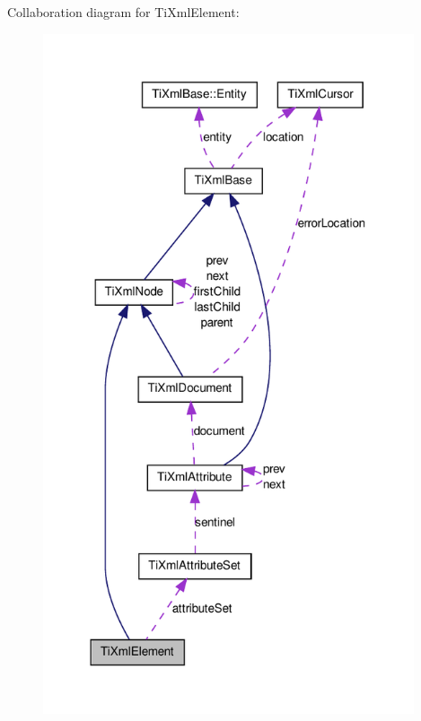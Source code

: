 Collaboration diagram for TiXmlElement:
\nopagebreak
\begin{figure}[H]
\begin{center}
\leavevmode
\includegraphics[width=310pt]{d7/d67/classTiXmlElement__coll__graph}
\end{center}
\end{figure}

